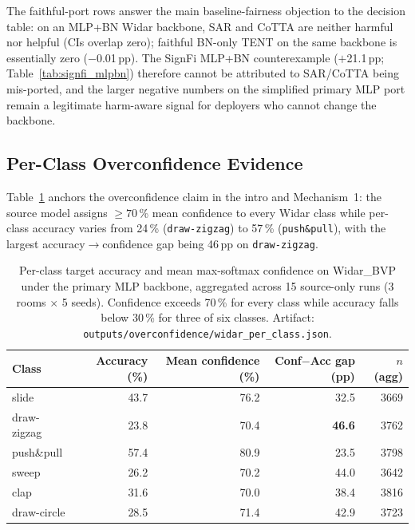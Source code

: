 The faithful-port rows answer the main baseline-fairness objection to the decision table: on an MLP+BN Widar backbone, SAR and CoTTA are neither harmful nor helpful (CIs overlap zero); faithful BN-only TENT on the same backbone is essentially zero ($-$0.01\,pp). The SignFi MLP+BN counterexample ($+$21.1\,pp; Table~\ref{tab:signfi_mlpbn}) therefore cannot be attributed to SAR/CoTTA being mis-ported, and the larger negative numbers on the simplified primary MLP port remain a legitimate harm-aware signal for deployers who cannot change the backbone.

\subsection{Per-Class Overconfidence Evidence}

Table~\ref{tab:overconfidence_main} anchors the overconfidence claim in the intro and Mechanism~1: the source model assigns $\geq 70$\,\% mean confidence to every Widar class while per-class accuracy varies from 24\,\% (\texttt{draw-zigzag}) to 57\,\% (\texttt{push\&pull}), with the largest accuracy$\to$confidence gap being 46\,pp on \texttt{draw-zigzag}.

\begin{table}[h]
\centering
\caption{Per-class target accuracy and mean max-softmax confidence on Widar\_BVP under the primary MLP backbone, aggregated across 15 source-only runs (3 rooms $\times$ 5 seeds). Confidence exceeds 70\,\% for every class while accuracy falls below 30\,\% for three of six classes. Artifact: \texttt{outputs/overconfidence/widar\_per\_class.json}.}
\label{tab:overconfidence_main}
\small
\setlength{\tabcolsep}{6pt}
\begin{tabular}{lrrrr}
\toprule
\textbf{Class} & \textbf{Accuracy (\%)} & \textbf{Mean confidence (\%)} & \textbf{Conf$-$Acc gap (pp)} & \textbf{$n$ (agg)} \\
\midrule
slide        & 43.7 & 76.2 & 32.5 & 3669 \\
draw-zigzag  & 23.8 & 70.4 & \textbf{46.6} & 3762 \\
push\&pull   & 57.4 & 80.9 & 23.5 & 3798 \\
sweep        & 26.2 & 70.2 & 44.0 & 3642 \\
clap         & 31.6 & 70.0 & 38.4 & 3816 \\
draw-circle  & 28.5 & 71.4 & 42.9 & 3723 \\
\bottomrule
\end{tabular}
\end{table}

